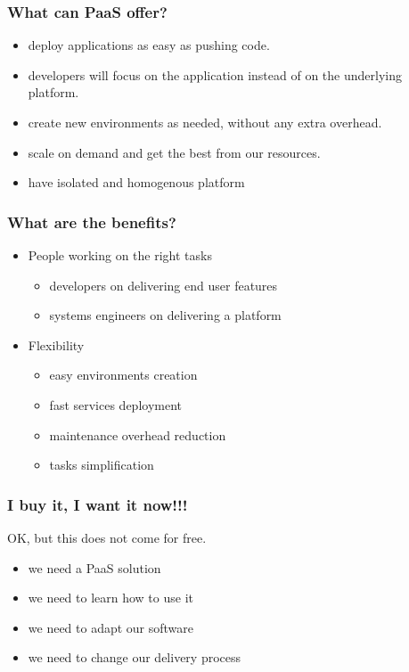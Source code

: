 \documentclass[bigger]{beamer}
\begin{document}
\begin{frame}
\frametitle{What can PaaS offer?}
\label{sec-1-4}


\begin{itemize}
\item deploy applications as easy as pushing code.
\item developers will focus on the application instead of on the underlying platform.
\item create new environments as needed, without any extra overhead.
\item scale on demand and get the best from our resources.
\item have isolated and homogenous platform
\end{itemize}
\end{frame}
\begin{frame}
\frametitle{What are the benefits?}
\label{sec-1-5}
\begin{itemize}

\item People working on the right tasks\\
\label{sec-1-5-1}%
\begin{itemize}
\item developers on delivering end user features
\item systems engineers on delivering a platform
\end{itemize}


\item Flexibility
\label{sec-1-5-2}%
\begin{itemize}
\item easy environments creation
\item fast services deployment
\item maintenance overhead reduction
\item tasks simplification
\end{itemize}

\end{itemize} %
\end{frame}
\begin{frame}
\frametitle{I buy it, I want it now!!!}
\label{sec-1-6}


OK, but this does not come for free.

\begin{itemize}
\item we need a PaaS solution
\item we need to learn how to use it
\item we need to adapt our software
\item we need to change our delivery process
\end{itemize}
\end{frame}
\end{document}
